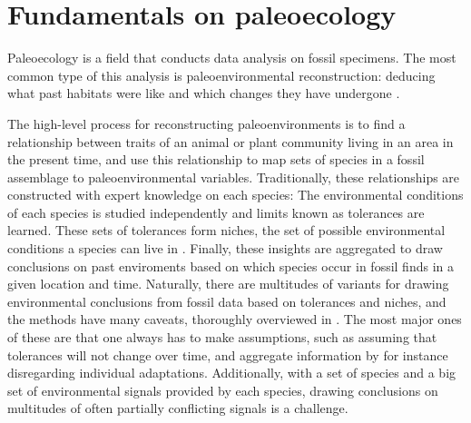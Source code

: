 \documentclass{article}
\begin{document}
\section{Fundamentals on paleoecology}

Paleoecology is a field that conducts data analysis on fossil specimens. The most common type of 
this analysis is paleoenvironmental reconstruction: deducing what past habitats were like and which 
changes they have undergone \cite{Faith_Lyman_2019}.

The high-level process for reconstructing paleoenvironments is to find a relationship between traits of an 
animal or plant community living in an area in the present time, and use this 
relationship to map sets of species in a fossil assemblage to paleoenvironmental variables.
Traditionally, these relationships are constructed with expert knowledge on each species: The environmental conditions of
each species is studied independently and limits known as tolerances are learned. These sets of tolerances form niches,
the set of possible environmental conditions a species can live in \cite{Faith_Lyman_2019}. Finally, these insights are aggregated to 
draw conclusions on past enviroments based on which species occur in fossil finds in a given location and time.
Naturally, there are multitudes of variants for drawing environmental conclusions from fossil data based on 
tolerances and niches, and the methods have many caveats, thoroughly overviewed in \cite{Faith_Lyman_2019}. The most major ones of these are that one always has to 
make assumptions, such as assuming that tolerances will not change over time, and aggregate information by for instance 
disregarding individual adaptations. Additionally, with a set of species and a big set of environmental signals provided 
by each species, drawing conclusions on multitudes of often partially conflicting signals is a challenge.
\end{document}
